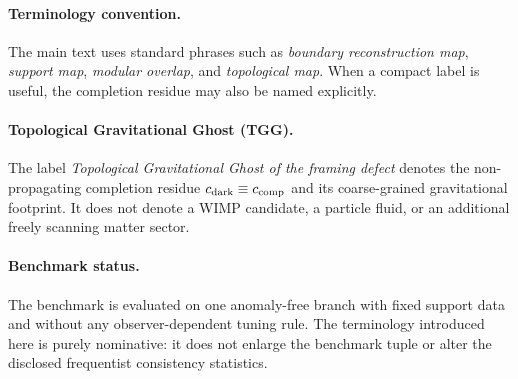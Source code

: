 \documentclass[11pt]{article}
\begin{document}
\paragraph{Terminology convention.}
The main text uses standard phrases such as \emph{boundary reconstruction map},
\emph{support map}, \emph{modular overlap}, and \emph{topological map}. When a
compact label is useful, the completion residue may also be named explicitly.

\paragraph{Topological Gravitational Ghost (TGG).}
The label \emph{Topological Gravitational Ghost of the framing defect} denotes
the non-propagating completion residue $c_{\rm dark}\equiv c_{\rm comp}$ and
its coarse-grained gravitational footprint. It does not denote a WIMP
candidate, a particle fluid, or an additional freely scanning matter sector.

\paragraph{Benchmark status.}
The benchmark is evaluated on one anomaly-free branch with fixed support data
and without any observer-dependent tuning rule. The terminology introduced here
is purely nominative: it does not enlarge the benchmark tuple or alter the
disclosed frequentist consistency statistics.
\end{document}
